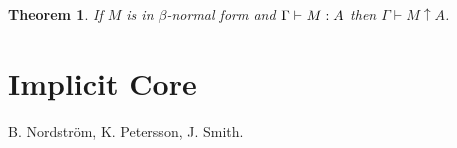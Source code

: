 \documentclass[11pt]{article}
\newtheorem{theorem}{Theorem}[section]
\begin{document}
\begin{theorem}
If $M$ is in $\beta$-normal form and $\Gamma\vdash_{}M:A$ then $\Gamma\vdash M\uparrow A$.
\end{theorem}


\section{Implicit Core}

\begin{thebibliography}{9}

B. Nordstr\"om, K. Petersson, J. Smith.



\end{thebibliography}
\end{document}
